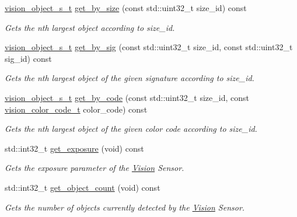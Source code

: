 \begin{DoxyCompactItemize}
\hyperlink{vision_8h_ae619120558539c13e53b5a6f42fb4375}{vision\+\_\+object\+\_\+s\+\_\+t} \hyperlink{classpros_1_1Vision_aa5cca450a5b80278a97bbea786195733}{get\+\_\+by\+\_\+size} (const std\+::uint32\+\_\+t size\+\_\+id) const
\begin{DoxyCompactList}\small\item\em Gets the nth largest object according to size\+\_\+id. \end{DoxyCompactList}\item 
\hyperlink{vision_8h_ae619120558539c13e53b5a6f42fb4375}{vision\+\_\+object\+\_\+s\+\_\+t} \hyperlink{classpros_1_1Vision_a10fd89ed3c5e8fe5ce25046a877c7d84}{get\+\_\+by\+\_\+sig} (const std\+::uint32\+\_\+t size\+\_\+id, const std\+::uint32\+\_\+t sig\+\_\+id) const
\begin{DoxyCompactList}\small\item\em Gets the nth largest object of the given signature according to size\+\_\+id. \end{DoxyCompactList}\item 
\hyperlink{vision_8h_ae619120558539c13e53b5a6f42fb4375}{vision\+\_\+object\+\_\+s\+\_\+t} \hyperlink{classpros_1_1Vision_a4b96f92a2ae2f29fd37709958f48e514}{get\+\_\+by\+\_\+code} (const std\+::uint32\+\_\+t size\+\_\+id, const \hyperlink{vision_8h_a71f2011a47e95558bb534b05c16c7f2b}{vision\+\_\+color\+\_\+code\+\_\+t} color\+\_\+code) const
\begin{DoxyCompactList}\small\item\em Gets the nth largest object of the given color code according to size\+\_\+id. \end{DoxyCompactList}\item 
std\+::int32\+\_\+t \hyperlink{classpros_1_1Vision_a80552b2897b8edcdb68bc56477213f2e}{get\+\_\+exposure} (void) const
\begin{DoxyCompactList}\small\item\em Gets the exposure parameter of the \hyperlink{classpros_1_1Vision}{Vision} Sensor. \end{DoxyCompactList}\item 
std\+::int32\+\_\+t \hyperlink{classpros_1_1Vision_a73869f85b3d2e468ffc51957d80f5a75}{get\+\_\+object\+\_\+count} (void) const
\begin{DoxyCompactList}\small\item\em Gets the number of objects currently detected by the \hyperlink{classpros_1_1Vision}{Vision} Sensor. \end{DoxyCompactList}\item 

\end{DoxyCompactItemize}
